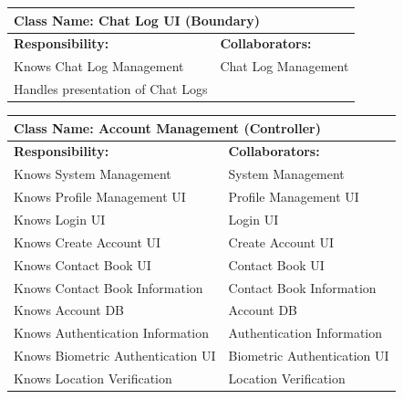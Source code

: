 \documentclass[]{article}
\begin{document}
\begin{table}[!ht]
	\centering
	\begin{tabular}{|p{7cm}|p{7cm}|}
		\hline
		\multicolumn{2}{|l|}{\textbf{Class Name:} Chat Log UI (Boundary)} \\
		\hline
		\textbf{Responsibility:}          & \textbf{Collaborators:}       \\
		\hline
		Knows Chat Log Management         & Chat Log Management           \\
		Handles presentation of Chat Logs &                               \\
		\hline
	\end{tabular}
\end{table}

\begin{table}[ht]
	\centering
	\begin{tabular}{|p{7cm}|p{7cm}|}
		\hline
		\multicolumn{2}{|l|}{\textbf{Class Name:} Account Management (Controller)}             \\
		\hline
		\textbf{Responsibility:}                             & \textbf{Collaborators:}  \\
		\hline
		Knows System Management                              & System Management 	      \\
		Knows Profile Management UI                          & Profile Management UI      \\
		Knows Login UI							             & Login UI                   \\
		Knows Create Account UI 						     & Create Account UI          \\
		Knows Contact Book UI								 & Contact Book UI            \\
		Knows Contact Book Information						 & Contact Book Information   \\
		Knows Account DB 								   	 & Account DB                 \\
		Knows Authentication Information					 & Authentication Information \\
		Knows Biometric Authentication UI					 & Biometric Authentication UI\\
		Knows Location Verification 						 & Location Verification      \\
		\hline
	\end{tabular}
\end{table}
\end{document}
